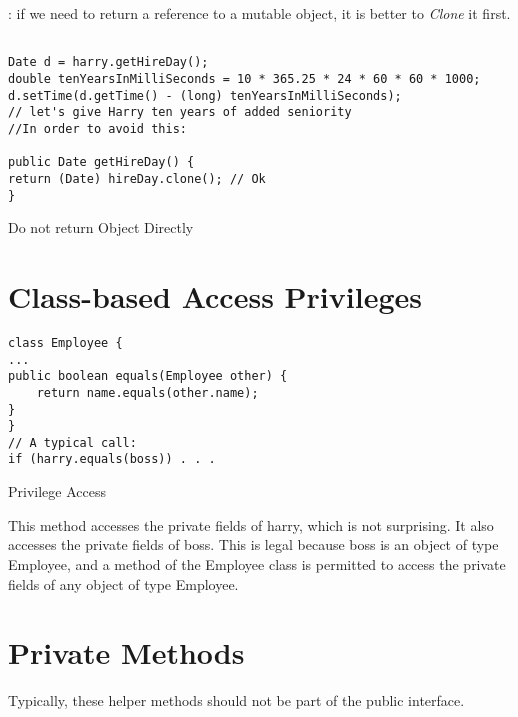 \documentclass[12pt,a4paper]{article}
\begin{document}
{} : if we need to return a reference to a mutable object, it is better to \textit{Clone} it first. \\

\begin{listing}[ht]
 \begin{verbatim}

Date d = harry.getHireDay();
double tenYearsInMilliSeconds = 10 * 365.25 * 24 * 60 * 60 * 1000;
d.setTime(d.getTime() - (long) tenYearsInMilliSeconds);
// let's give Harry ten years of added seniority
//In order to avoid this:

public Date getHireDay() {
return (Date) hireDay.clone(); // Ok
}

 \end{verbatim}
 \label{code:2}
 \caption{Do not return Object Directly}
 \end{listing}
 \FloatBarrier

\section{Class-based Access Privileges}

\begin{listing}[ht]
 \begin{verbatim}
class Employee {
...
public boolean equals(Employee other) {
	return name.equals(other.name);
}
}
// A typical call:
if (harry.equals(boss)) . . .
 \end{verbatim}
 \label{code:3}
 \caption{Privilege Access}
 \end{listing}
 \FloatBarrier

This method accesses the private fields of harry, which is not surprising. It also accesses the private fields of boss. This is legal because boss is an object of type Employee, and a method of the Employee class is permitted to access the private fields of any object of type Employee.\\

\section{Private Methods}

Typically, these helper methods should not be part of the public interface.\\
\end{document}

